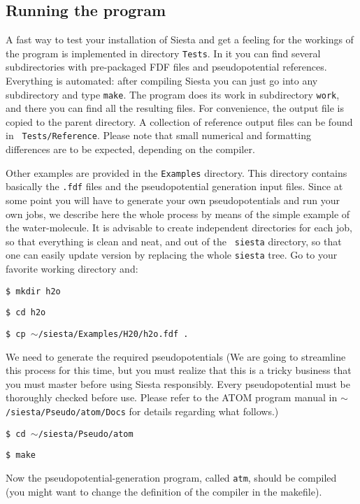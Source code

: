 \documentclass[11pt]{article}
\begin{document}
\subsection{Running the program}

A fast way to test your installation of {\sc Siesta} and get a feeling
for the workings of the program is implemented in directory
{\tt Tests}. In it you can find several subdirectories
with pre-packaged FDF files and pseudopotential references. Everything
is automated: after compiling {\sc Siesta} you can just go into any
subdirectory and type {\tt make}. The program does its work in
subdirectory {\tt work}, and there you can find all the resulting
files. For convenience, the output file is copied to the parent
directory. A collection of reference output files can be found in {\tt
  Tests/Reference}. Please note that small numerical and
formatting differences are to be expected, depending on the compiler.

Other examples are provided in the {\tt Examples} directory. This
directory contains basically the {\tt .fdf} files and the
pseudopotential generation input files. Since at some point you will
have to generate your own pseudopotentials and run your own jobs, we
describe here the whole process by means of the simple example of the
water-molecule. It is advisable to create independent directories for
each job, so that everything is clean and neat, and out of the {\tt
siesta} directory, so that one can easily update version by replacing
the whole {\tt siesta} tree. Go to your favorite working directory
and:

{\tt \$ mkdir h2o}

{\tt \$ cd h2o}

{\tt \$ cp $\sim$/siesta/Examples/H20/h2o.fdf .}

\noindent
We need to generate the required pseudopotentials
(We are going to streamline this process for this time, but
you must realize that this is a tricky business that you 
must master before using {\sc Siesta} responsibly. Every 
pseudopotential must be thoroughly checked before use. Please refer to
the {\sc ATOM} program manual in {\tt $\sim$/siesta/Pseudo/atom/Docs}
for details regarding what follows.)

{\tt \$ cd $\sim$/siesta/Pseudo/atom}

{\tt \$ make}

\noindent
Now the pseudopotential-generation program, called {\tt atm}, 
should be compiled (you might want to change the definition of
the compiler in the makefile).
\end{document}

